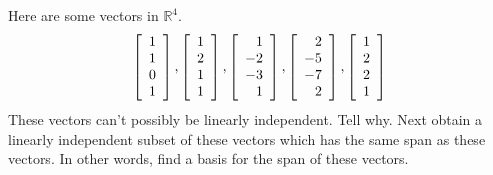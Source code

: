 \begin{enumialphparenastyle}
\begin{ex} Here are some vectors in $\mathbb{R}^{4}$. 
\begin{equation*}
\left[ 
\begin{array}{r}
1 \\ 
1 \\ 
0 \\ 
1
\end{array}
\right] ,\left[ 
\begin{array}{r}
1 \\ 
2 \\ 
1 \\ 
1
\end{array}
\right] ,\left[ 
\begin{array}{r}
1 \\ 
-2 \\ 
-3 \\ 
1
\end{array}
\right] ,\left[ 
\begin{array}{r}
2 \\ 
-5 \\ 
-7 \\ 
2
\end{array}
\right] ,\left[ 
\begin{array}{r}
1 \\ 
2 \\ 
2 \\ 
1
\end{array}
\right]
\end{equation*}
These vectors can't possibly be linearly independent. Tell why. Next obtain a
linearly independent subset of these vectors which has the same span as
these vectors. In other words, find a basis for the span of these vectors.
\end{ex}


\end{enumialphparenastyle}
